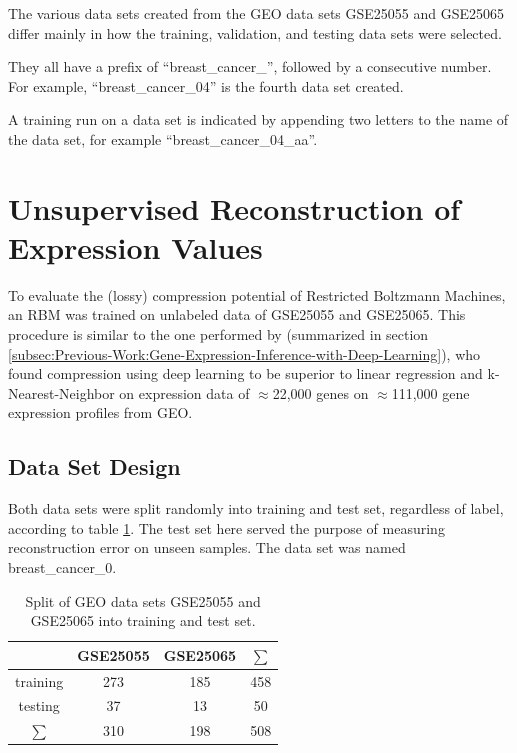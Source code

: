 The various data sets created from the GEO data sets GSE25055 and
GSE25065 differ mainly in how the training, validation, and testing
data sets were selected.

They all have a prefix of ``breast\_cancer\_'', followed by a consecutive
number. For example, ``breast\_cancer\_04'' is the fourth data set
created.

A training run on a data set is indicated by appending two letters
to the name of the data set, for example ``breast\_cancer\_04\_aa''.

\section{Unsupervised Reconstruction of Expression Values\label{sec:Unsupervised-Reconstruction-of-Expression-Values}}

To evaluate the (lossy) compression potential of Restricted Boltzmann
Machines, an RBM was trained on unlabeled data of GSE25055 and GSE25065.
This procedure is similar to the one performed by \cite{ChenXie2015}
(summarized in section \ref{subsec:Previous-Work:Gene-Expression-Inference-with-Deep-Learning}),
who found compression using deep learning to be superior to linear
regression and k-Nearest-Neighbor on expression data of $\approx$22,000
genes on $\approx$111,000 gene expression profiles from GEO.

\subsection{Data Set Design}

Both data sets were split
randomly into training and test set, regardless of label, according
to table \ref{tab:training-and-testing-set-of-breast_cancer_0}. The
test set here served the purpose of measuring reconstruction error
on unseen samples. The data set was named breast\_cancer\_0.

\begin{table}
\begin{centering}
\begin{tabular}{|c|c|c|c|}
\hline 
 & GSE25055 & GSE25065 & $\sum$\tabularnewline
\hline 
\hline 
training & 273 & 185 & 458\tabularnewline
\hline 
testing & 37 & 13 & 50\tabularnewline
\hline 
$\sum$ & 310 & 198 & 508\tabularnewline
\hline 
\end{tabular}
\par\end{centering}
\caption{\label{tab:training-and-testing-set-of-breast_cancer_0}Split of GEO
data sets GSE25055 and GSE25065 into training and test set.}
\end{table}


